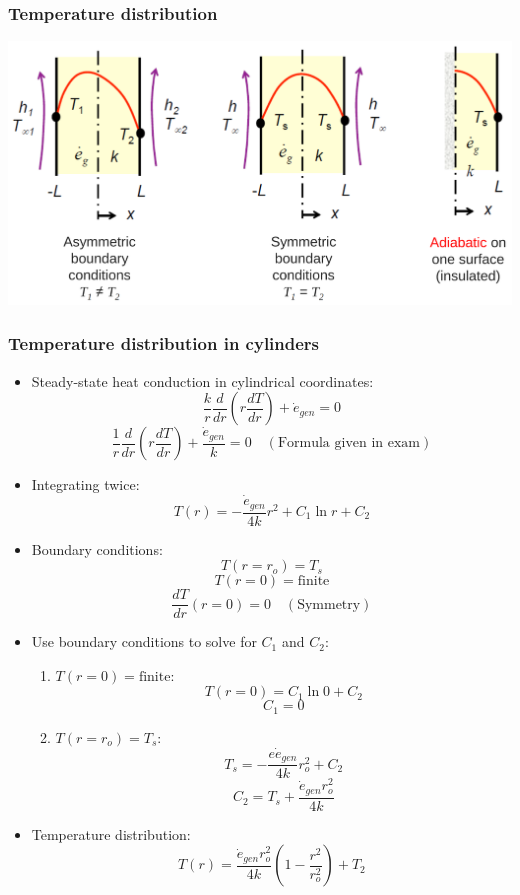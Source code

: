 \documentclass[11pt]{article}
\begin{document}
\subsubsection{Temperature distribution}
\label{sec:org4e3ab34}
\begin{center}
\includegraphics[width=.9\linewidth]{./images/steady-internal-heat-generation-temperature-distribution.png}
\end{center}

 \newpage

\subsubsection{Temperature distribution in cylinders}
\label{sec:orgb1f69d6}
\begin{itemize}
\item Steady-state heat conduction in cylindrical coordinates:
\[\frac{k}{r} \frac{d}{dr} \left(r \frac{dT}{dr} \right) + \dot{e}_{gen} = 0\]
\[\frac{1}{r} \frac{d}{dr} \left(r \frac{dT}{dr} \right) + \frac{\dot{e}_{gen}}{k} = 0 \quad (\text{Formula given in exam})\]
\item Integrating twice:
\[T(r) = - \frac{\dot{e}_{gen}}{4k} r^2 + C_1 \ln r + C_2\]
\item Boundary conditions:
\[T(r = r_o) = T_s\]
\[T(r = 0) = \text{finite}\]
\[\frac{dT}{dr}(r = 0) = 0 \quad (\text{Symmetry})\]
\item Use boundary conditions to solve for \(C_1\) and \(C_2\):
\begin{enumerate}
\item \(T(r = 0) = \text{finite}\):
\[T(r = 0) = C_1 \ln 0 + C_2\]
\[C_1 = 0\]
\item \(T(r= r_o) = T_s\):
\[T_s = - \frac{e\dot{e}_{gen}}{4k} r_o^2 + C_2\]
\[C_2 = T_s + \frac{\dot{e}_{gen} r_o^2}{4k}\]
\end{enumerate}
\item Temperature distribution:
\[T(r) = \frac{\dot{e}_{gen} r_o^2}{4k} \left(1 - \frac{r^2}{r_o^2} \right) + T_2\]
\end{itemize}
\end{document}
